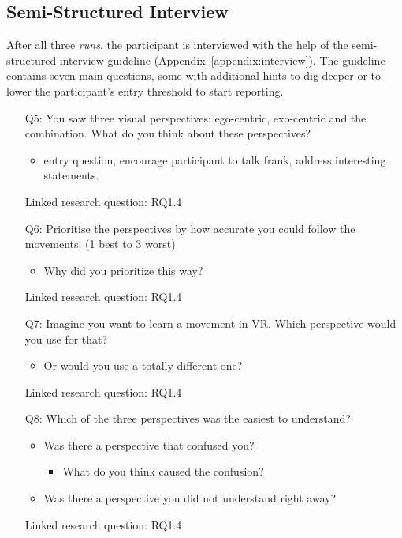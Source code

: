 \subsection{Semi-Structured Interview}
After all three \textit{runs}, the participant is interviewed with the help of the semi-structured interview guideline (Appendix~\ref{appendix:interview}). The guideline contains seven main questions, some with additional hints to dig deeper or to lower the participant's entry threshold to start reporting.
\begin{itemize}
	\item[Q5:] You saw three visual perspectives: ego-centric, exo-centric and the combination. What do you think about these perspectives?
	\begin{itemize}
		\item entry question, encourage participant to talk frank, address interesting statements.
	\end{itemize}
	\item[] Linked research question: RQ1.4
	
	\item[Q6:] Prioritise the perspectives by how accurate you could follow the movements. (1 best to 3 worst) 	
	\begin{itemize}
		\item Why did you prioritize this way?
	\end{itemize}
	\item[] Linked research question: RQ1.4
	
	\item[Q7:] Imagine you want to learn a movement in VR. Which perspective would you use for that?
	\begin{itemize}
		\item Or would you use a totally different one?
	\end{itemize}
	\item[] Linked research question: RQ1.4
	
	\item[Q8:] Which of the three perspectives was the easiest to understand? 
	\begin{itemize}
		\item Was there a perspective that confused you?
		\begin{itemize}
			\item What do you think caused the confusion?
		\end{itemize}
		\item Was there a perspective you did not understand right away?
	\end{itemize}
	\item[] Linked research question: RQ1.4
	

\end{itemize}
